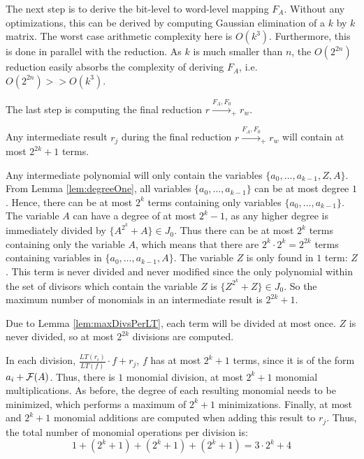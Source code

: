 The next step is to derive the bit-level to word-level mapping $F_A$. Without 
any optimizations, this can be derived by computing Gaussian elimination of a 
$k$ by $k$ matrix. The worst case arithmetic complexity here is $O(k^3)$. 
Furthermore, this is done
in parallel with the reduction. As $k$ is much smaller than $n$, the $O(2^{2n})$
reduction easily absorbs the complexity of deriving $F_A$, i.e. $O(2^{2n})>>O(k^3)$.

The last step is computing the final reduction $r\xrightarrow{F_A,F_0}_+ r_w$.
\begin{Lemma}Any intermediate result $r_j$ during the final reduction $r\xrightarrow{F_A,F_0}_+ r_w$ 
will contain at most $2^{2k}+1$ terms.
\end{Lemma}
\begin{Proof}
Any intermediate polynomial will only contain the variables 
$\{a_0,\dots,a_{k-1},Z,A\}$. From Lemma \ref{lem:degreeOne},
all variables $\{a_0,\dots,a_{k-1}\}$ can be at most degree $1$.
Hence, there can be at most $2^k$ terms 
containing only variables $\{a_0,\dots,a_{k-1}\}$.
The variable $A$ can have a degree of at
most $2^k-1$, as any higher degree is immediately divided by $\{A^{2^k}+A\}\in J_0$.
Thus there can be at most $2^k$ terms containing only the variable $A$, which
means that there are $2^k\cdot 2^k=2^{2k}$ terms containing variables in 
$\{a_0,\dots,a_{k-1},A\}$.
The variable $Z$ is only found in $1$ term: $Z$. This term is never divided
and never modified since the only polynomial within the set of divisors
which contain the variable $Z$ is $\{Z^{2^k}+Z\}\in J_0$. So the maximum 
number of monomials in an intermediate result is $2^{2k}+1$.
\end{Proof}

\begin{Lemma}
Due to Lemma \ref{lem:maxDivsPerLT}, each term will be divided at most
once. $Z$ is never divided, so at most $2^{2k}$ divisions are computed.
\end{Lemma}

In each division, $\frac{LT(r_i)}{LT(f)}\cdot f+r_j$, $f$ has at most 
$2^k+1$ terms, since it is of the form $a_i+{\mathcal{F}}(A)$. 
Thus, there is $1$ monomial division, at most $2^k+1$ monomial multiplications.
As before, the degree of each resulting monomial needs to be minimized, 
which performs a maximum of $2^k+1$ minimizations. 
Finally, at most and $2^k+1$ monomial additions are computed when adding this 
result to $r_j$. Thus, the total number of monomial operations per division is:
\begin{equation}
1+(2^k+1)+(2^k+1)+(2^k+1)=3\cdot 2^k+4
\end{equation}


